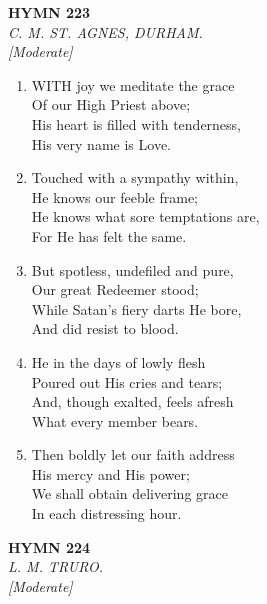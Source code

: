 \documentclass[11pt,a4paper]{article}
\begin{document}
\newpage
\begin{center}
    {\Large \textbf{HYMN 223}}
    \\
    \textit{C. M. ST. AGNES, DURHAM.}
    \\
    \textit{\small [Moderate]}
\end{center}
\vspace{1em}

\begin{enumerate}
    \item WITH joy we meditate the grace \\
            Of our High Priest above; \\
        His heart is filled with tenderness, \\
            His very name is Love.

    \item Touched with a sympathy within, \\
            He knows our feeble frame; \\
        He knows what sore temptations are, \\
            For He has felt the same.

    \item But spotless, undefiled and pure, \\
            Our great Redeemer stood; \\
        While Satan's fiery darts He bore, \\
            And did resist to blood.

    \item He in the days of lowly flesh \\
            Poured out His cries and tears; \\
        And, though exalted, feels afresh \\
            What every member bears.

    \item Then boldly let our faith address \\
            His mercy and His power; \\
        We shall obtain delivering grace \\
            In each distressing hour.

\end{enumerate}

\newpage
\begin{center}
    {\Large \textbf{HYMN 224}}
    \\
    \textit{L. M. TRURO.}
    \\
    \textit{\small [Moderate]}
\end{center}
\vspace{1em}
\end{document}
